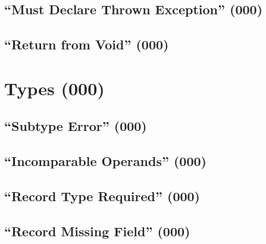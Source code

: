 \subsection{``Must Declare Thrown Exception'' (000)}

\subsection{``Return from Void'' (000)}
	
\section{Types (000)}
\subsection{``Subtype Error'' (000)}
\subsection{``Incomparable Operands'' (000)}
\subsection{``Record Type Required'' (000)}
\subsection{``Record Missing Field'' (000)}

